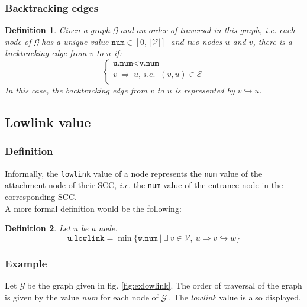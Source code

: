 \documentclass[a4 paper, 12pt]{article}
\def\GG{$\mathcal{G}~$}
\newtheorem{definition}{Definition}
\begin{document}
\subsubsection{Backtracking edges}
\begin{definition}
    Given a graph \GG and an order of traversal in this graph, \textit{i.e.} each node of \GG has a unique value $\texttt{num} \in [0,~|\mathcal{V}|]~$ and two nodes $u$ and $v$, there is a backtracking edge from $v$ to $u$ if:
    \begin{equation*}
        \left\{
            \begin{array}{l}
                \texttt{u.num} < \texttt{v.num}\\
                v~\Rightarrow~u,~\textit{i.e. }~(v, u) \in \mathcal{E}\\
            \end{array}
        \right.
    \end{equation*}
    In this case, the backtracking edge from $v$ to $u$ is represented by $v \hookrightarrow u$.\\      
\end{definition}


\subsection{Lowlink value}
\subsubsection{Definition}
Informally, the \texttt{lowlink} value of a node represents the \texttt{num} value of the attachment node of their SCC, \textit{i.e.} the \texttt{num} value of the entrance node in the corresponding SCC.\\

A more formal definition would be the following:
\begin{definition}
    Let $u$ be a node.
    \begin{equation*}
        \texttt{u.lowlink} = \min \{\texttt{w.num}~|~\exists~v\in \mathcal{V},~u \Rightarrow v \hookrightarrow w\}
    \end{equation*}
\end{definition}

\subsubsection{Example}
Let \GG be the graph given in fig. \ref{fig:exlowlink}. The order of traversal of the graph is given by the value \textit{num} for each node of \GG. The \textit{lowlink} value is also displayed.
\end{document}
